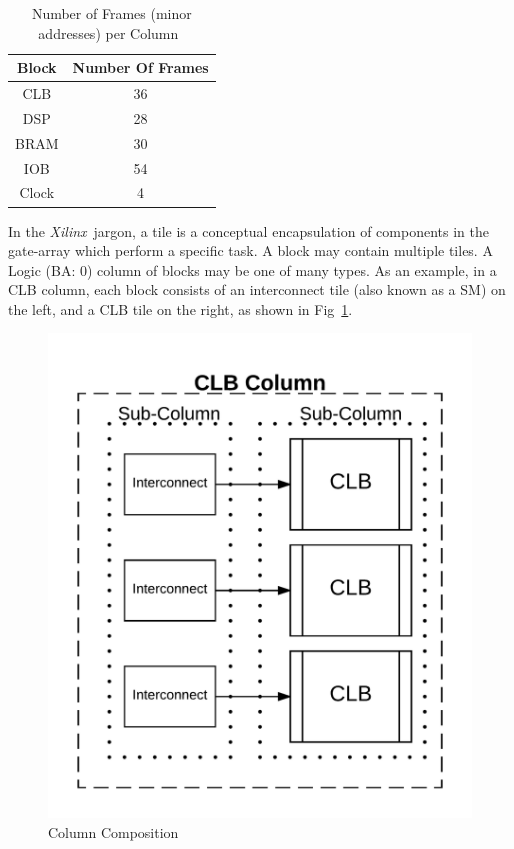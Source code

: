 \documentclass[conference]{IEEEtran}
\newcommand{\Xilinx}{\textit{\gls{Xilinx}}~}
\begin{document}
\begin{table}[h]
	\centering
	\caption{Number of Frames (minor addresses) per Column~\cite{virtex5ConfigGuide}}
	\label{tbl:minorAddressNumbers}
	\begin{tabular}{|c|c|}
		\hline
		Block             & Number Of Frames \\ \hline
		CLB               & 36               \\ \hline
		DSP               & 28               \\ \hline
		\acrshort{BRAM}   & 30               \\ \hline
		IOB               & 54               \\ \hline
		Clock             & 4                \\ \hline
	\end{tabular}
\end{table}

In the \Xilinx jargon, a tile is a conceptual encapsulation of components in the gate-array which perform a specific task.
A block may contain multiple tiles.
A Logic (BA: 0) column of blocks may be one of many types.
As an example, in a \acrfull{CLB} column, each block consists of an interconnect tile (also known as a \acrfull{SM}) on the left, and a \acrshort{CLB} tile on the right, as shown in Fig~\ref{fig:column}.
\begin{figure}[h]
	\centering
	\includegraphics[width=0.8\linewidth]{../Thesis/Figures/column}
	\caption[Column Composition]{Column Composition}
	\label{fig:column}
\end{figure}
\end{document}
